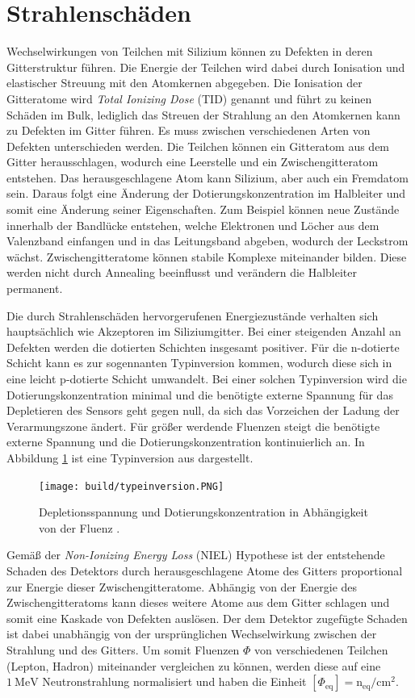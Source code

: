 \section{Strahlenschäden}
Wechselwirkungen von Teilchen mit Silizium können zu Defekten in deren
Gitterstruktur führen.
Die Energie der Teilchen wird dabei durch Ionisation und elastischer Streuung mit den Atomkernen abgegeben. Die Ionisation der
Gitteratome wird \textit{Total Ionizing Dose} (TID) genannt und führt zu keinen Schäden im Bulk, lediglich das Streuen der Strahlung an den
Atomkernen kann zu Defekten im Gitter führen.
Es muss zwischen verschiedenen Arten von Defekten unterschieden werden. Die Teilchen können ein Gitteratom aus dem
Gitter herausschlagen, wodurch eine Leerstelle und ein Zwischengitteratom entstehen. Das herausgeschlagene Atom
kann Silizium, aber auch ein Fremdatom sein. Daraus folgt eine Änderung der Dotierungskonzentration im
Halbleiter und somit eine Änderung seiner Eigenschaften. Zum Beispiel können neue Zustände innerhalb der
Bandlücke entstehen, welche Elektronen und Löcher aus dem Valenzband einfangen  und in das Leitungsband
abgeben, wodurch der Leckstrom wächst.
Zwischengitteratome können stabile Komplexe miteinander bilden. Diese werden nicht durch Annealing
beeinflusst und verändern die Halbleiter permanent.

Die durch Strahlenschäden hervorgerufenen Energiezustände verhalten sich hauptsächlich wie Akzeptoren im Siliziumgitter. Bei
einer steigenden Anzahl an Defekten werden die dotierten Schichten insgesamt positiver. Für die n-dotierte Schicht kann
es zur sogennanten Typinversion kommen, wodurch diese sich in eine leicht p-dotierte Schicht umwandelt. Bei einer
solchen Typinversion wird die Dotierungskonzentration minimal und die benötigte externe Spannung für das Depletieren des Sensors geht gegen null, da sich
das Vorzeichen der Ladung der Verarmungszone ändert.
Für größer werdende Fluenzen steigt die benötigte externe Spannung und die
Dotierungskonzentration kontinuierlich an.
In Abbildung \ref{fig:typeinversion} ist eine Typinversion aus \cite{typinversion} dargestellt.

\begin{figure}
  \centering
    \texttt{[image: build/typeinversion.PNG]}
\caption{Depletionsspannung und Dotierungskonzentration in Abhängigkeit von der Fluenz \cite{typinversion}.}
\label{fig:typeinversion}
\end{figure}

Gemäß der \textit{Non-Ionizing Energy Loss} (NIEL) Hypothese ist der entstehende Schaden des Detektors durch
herausgeschlagene Atome des Gitters proportional zur Energie dieser Zwischengitteratome.
Abhängig von der Energie des Zwischengitteratoms kann dieses weitere Atome aus dem Gitter schlagen und somit
eine Kaskade von Defekten auslösen. Der dem Detektor zugefügte Schaden ist dabei unabhängig von der
ursprünglichen Wechselwirkung zwischen der Strahlung und des Gitters.
Um somit Fluenzen $ \Phi$ von verschiedenen Teilchen (Lepton, Hadron) miteinander vergleichen zu können, werden diese
auf eine $\SI{1}{\mega\eV}$ Neutronstrahlung normalisiert und haben die Einheit $[\Phi_{\mathrm{eq}}]=\mathrm{n_{\mathrm{eq}}/cm^2}$.


